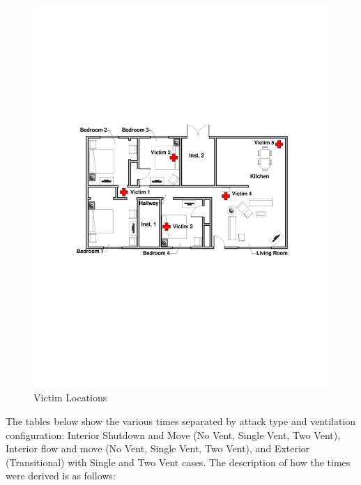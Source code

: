 \documentclass[12pt,oneside]{book}
\begin{document}
\begin{figure}[H]
	\includegraphics[width=.75\textheight]{../0_Images/Instrumentation/Victim_Locations_New}
	\caption{Victim Locations}
	\label{fig:victims}
\end{figure}

The tables below show the various times separated by attack type and ventilation configuration: Interior Shutdown and Move (No Vent, Single Vent, Two Vent), Interior flow and move (No Vent, Single Vent, Two Vent), and Exterior (Transitional) with Single and Two Vent cases. The description of how the times were derived is as follows:
\end{document}
